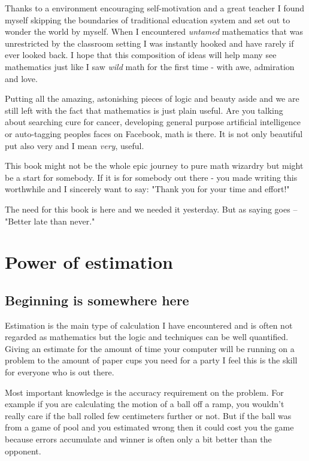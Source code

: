 \documentclass[pdftex, 12pt, a4paper]{report}
\begin{document}
		
		Thanks to a environment encouraging self-motivation and a great teacher I found myself skipping the boundaries of traditional education system and set out to wonder the world by myself. When I encountered \textit{untamed} mathematics that was unrestricted by the classroom setting I was instantly hooked and have rarely if ever looked back. I hope that this composition of ideas will help many see mathematics just like I saw \textit{wild} math for the first time - with awe, admiration and love. \par
		
		Putting all the amazing, astonishing pieces of logic and beauty aside and we are still left with the fact that mathematics is just plain useful. Are you talking about searching cure for cancer, developing general purpose artificial intelligence or auto-tagging peoples faces on Facebook, math is there. It is not only beautiful put also very and I mean \textit{very}, useful. \par
		
		This book might not be the whole epic journey to pure math wizardry but might be a start for somebody. If it is for somebody out there - you made writing this worthwhile and I sincerely want to say: "Thank you for your time and effort!"
		
		The need for this book is here and we needed it yesterday. But as saying goes -- "Better late than never."
				
	
	
	\chapter{Power of estimation}
	
	\section{Beginning is somewhere here}
	Estimation is the main type of calculation I have encountered and is often not regarded as mathematics but the logic and techniques can be well quantified. Giving an estimate for the amount of time your computer will be running on a problem to the amount of paper cups you need for a party I feel this is the skill for everyone who is out there. \par
	
	Most important knowledge is the accuracy requirement on the problem. For example if you are calculating the motion of a ball off a ramp, you wouldn't really care if the ball rolled few centimeters further or not. But if the ball was from a game of pool and you estimated wrong then it could cost you the game because errors accumulate and winner is often only a bit better than the opponent. \par
	
\end{document}
